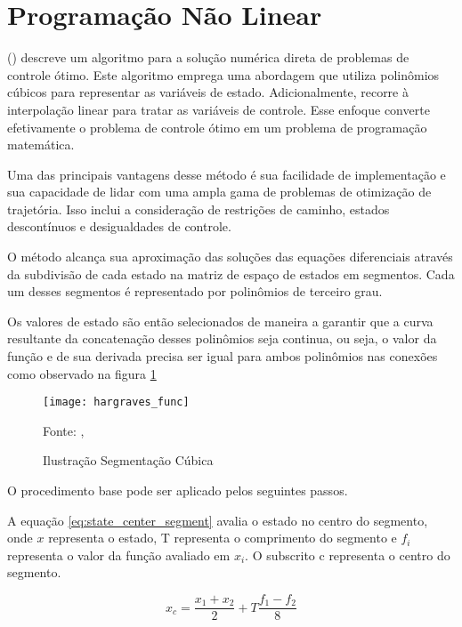 \section{Programação Não Linear}
\label{sec:hargraves}

\citeauthor{hargraves87} (\citeyear{hargraves87}) descreve um algoritmo para a solução numérica direta de problemas de controle ótimo. Este algoritmo emprega uma abordagem que utiliza polinômios cúbicos para representar as variáveis de estado. Adicionalmente, recorre à interpolação linear para tratar as variáveis de controle. Esse enfoque converte efetivamente o problema de controle ótimo em um problema de programação matemática.

Uma das principais vantagens desse método é sua facilidade de implementação e sua capacidade de lidar com uma ampla gama de problemas de otimização de trajetória. Isso inclui a consideração de restrições de caminho, estados descontínuos e desigualdades de controle.

O método alcança sua aproximação das soluções das equações diferenciais através da subdivisão de cada estado na matriz de espaço de estados em segmentos. Cada um desses segmentos é representado por polinômios de terceiro grau.

Os valores de estado são então selecionados de maneira a garantir que a curva resultante da concatenação desses polinômios seja continua, ou seja, o valor da função e de sua derivada precisa ser igual para ambos polinômios nas conexões como observado na figura \ref{fig:hargraves_fun}

\begin{figure}[H]
    \centering
    \caption{Ilustração Segmentação Cúbica}
    \texttt{[image: hargraves\_func]}

    {\footnotesize Fonte: \citeauthor{hargraves87}, \citeyear{hargraves87}}
    \label{fig:hargraves_fun}
\end{figure}

O procedimento base pode ser aplicado pelos seguintes passos.

A equação \ref{eq:state_center_segment} avalia o estado no centro do segmento, onde $x$ representa o estado, T representa o comprimento do segmento e $f_i$ representa o valor da função avaliado em $x_i$. O subscrito c representa o centro do segmento.

\begin{equation}
    \label{eq:state_center_segment}
    x_c = \frac{x_{1} + x_{2}}{2} + T\frac{f_{1} - f_{2}}{8}
\end{equation}


